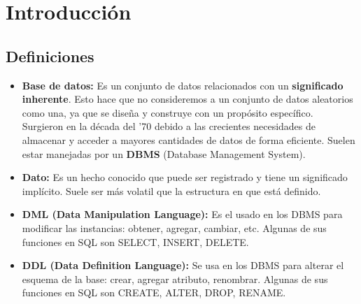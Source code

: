\section*{Introducción}



\subsection*{Definiciones}
\begin{itemize}
    \item \textbf{Base de datos:} Es un conjunto de datos relacionados con un \textbf{significado inherente}. Esto hace que no consideremos a un conjunto de datos aleatorios como una, ya que se diseña y construye con un propósito específico. \\
    Surgieron en la década del '70 debido a las crecientes necesidades de almacenar y acceder a mayores cantidades de datos de forma eficiente. Suelen estar manejadas por un \textbf{DBMS} (Database Management System).
    \item \textbf{Dato:} Es un hecho conocido que puede ser registrado y tiene un significado implícito. Suele ser más volatil que la estructura en que está definido.
    \item \textbf{DML (Data Manipulation Language):} Es el usado en los DBMS para modificar las instancias: obtener, agregar, cambiar, etc. Algunas de sus funciones en SQL son SELECT, INSERT, DELETE.
    \item \textbf{DDL (Data Definition Language):} Se usa en los DBMS para alterar el esquema de la base: crear, agregar atributo, renombrar. Algunas de sus funciones en SQL son CREATE, ALTER, DROP, RENAME.
\end{itemize}

